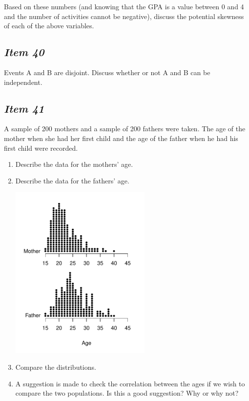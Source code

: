 Based on these numbers (and knowing that the GPA is a value between 0 and 4 and the number of activities cannot be negative), discuss the potential skewness of each of the above variables.

\subsection{\textbf{\textit{Item 40}}}
Events A and B are disjoint.  Discuss whether or not A and B can be independent. 

\subsection{\textbf{\textit{Item 41}}}
A sample of 200 mothers and a sample of 200 fathers were taken.  The age of the mother when she had her first child and the age of the father when he had his first child were recorded.

\begin{enumerate}[leftmargin=1cm, itemsep=.2em]
\item Describe the data for the mothers' age.
\item Describe the data for the fathers' age.
\begin{marginfigure}
\includegraphics[width=2.75in]{includes/Item35.pdf}
\end{marginfigure}
\item Compare the distributions.
\item A suggestion is made to check the correlation between the ages if we wish to compare the two populations.  Is this a good suggestion?  Why or why not?
\end{enumerate}

